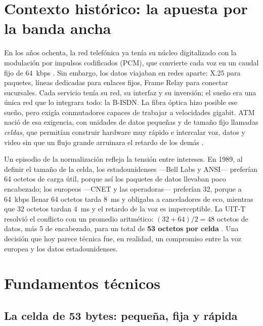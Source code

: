 \documentclass[12pt,a4paper]{article}
\begin{document}
\section{Contexto histórico: la apuesta por la banda ancha}

En los años ochenta, la red telefónica ya tenía su núcleo digitalizado con la modulación por impulsos codificados (PCM), que convierte cada voz en un caudal fijo de 64~kbps \cite{schwartz1987}. Sin embargo, los datos viajaban en redes aparte: X.25 para paquetes, líneas dedicadas para enlaces fijos, Frame Relay para conectar sucursales. Cada servicio tenía su red, su interfaz y su inversión; el sueño era una única red que lo integrara todo: la B-ISDN. La fibra óptica hizo posible ese sueño, pero exigía conmutadores capaces de trabajar a velocidades gigabit. ATM nació de esa exigencia, con unidades de datos pequeñas y de tamaño fijo llamadas \emph{celdas}, que permitían construir hardware muy rápido e intercalar voz, datos y video sin que un flujo grande arruinara el retardo de los demás \cite{deprycker1995, mcdysan1995}.

Un episodio de la normalización refleja la tensión entre intereses. En 1989, al definir el tamaño de la celda, los estadounidenses ---Bell Labs y ANSI--- preferían 64 octetos de carga útil, porque así los paquetes de datos llevaban poco encabezado; los europeos ---CNET y las operadoras--- preferían 32, porque a 64~kbps llenar 64 octetos tarda 8~ms y obligaba a canceladores de eco, mientras que 32 octetos tardan 4~ms y el retardo de la voz es imperceptible. La UIT-T resolvió el conflicto con un promedio aritmético: $(32+64)/2 = 48$ octetos de datos, más 5 de encabezado, para un total de \textbf{53 octetos por celda} \cite{deprycker1995, chao2001}. Una decisión que hoy parece técnica fue, en realidad, un compromiso entre la voz europea y los datos estadounidenses.

\section{Fundamentos técnicos}

\subsection{La celda de 53 bytes: pequeña, fija y rápida}
\end{document}
